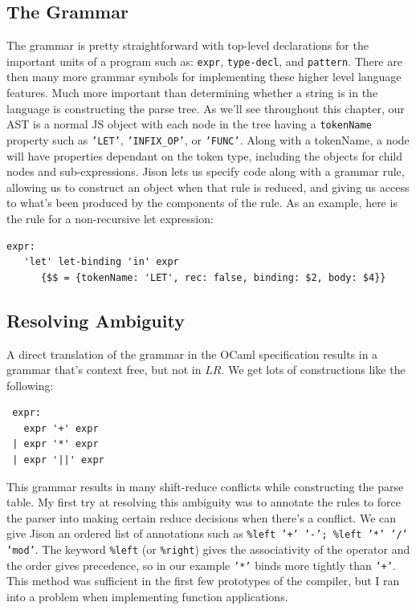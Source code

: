 \documentclass[12pt,a4paper,twoside,openright]{report}
\begin{document}
\subsection{The Grammar}
The grammar is pretty straightforward with top-level declarations for the important units of a program such as: {\tt expr}, {\tt type-decl}, and {\tt pattern}.
There are then many more grammar symbols for implementing these higher level language features.
Much more important than determining whether a string is in the language is constructing the parse tree.
As we'll see throughout this chapter, our AST is a normal JS object with each node in the tree having a {\tt tokenName} property such as {\tt 'LET'}, {\tt 'INFIX\_OP'}, or {\tt 'FUNC'}.
Along with a tokenName, a node will have properties dependant on the token type, including the objects for child nodes and sub-expressions.
Jison lets us specify code along with a grammar rule, allowing us to construct an object when that rule is reduced, and giving us access to what's been produced by the components of the rule.
As an example, here is the rule for a non-recursive let expression:
\begin{verbatim}
expr:
   'let' let-binding 'in' expr
      {$$ = {tokenName: 'LET', rec: false, binding: $2, body: $4}} \end{verbatim}
\subsection{Resolving Ambiguity}
A direct translation of the grammar in the OCaml specification \cite{ocamlspec} results in a grammar that's context free, but not in $LR$. We get lots of constructions like the following:
\begin{verbatim} expr:
   expr '+' expr
 | expr '*' expr
 | expr '||' expr \end{verbatim}
This grammar results in many shift-reduce conflicts while constructing the parse table.
My first try at resolving this ambiguity was to annotate the rules to force the parser into making certain reduce decisions when there's a conflict.
We can give Jison an ordered list of annotations such as {\tt \%left '+' '-'; \%left '*' '/' 'mod'}.
The keyword {\tt \%left} (or {\tt \%right}) gives the associativity of the operator and the order gives precedence, so in our example {\tt '*'} binds more tightly than {\tt '+'}.
This method was sufficient in the first few prototypes of the compiler, but I ran into a problem when implementing function applications.
\end{document}
